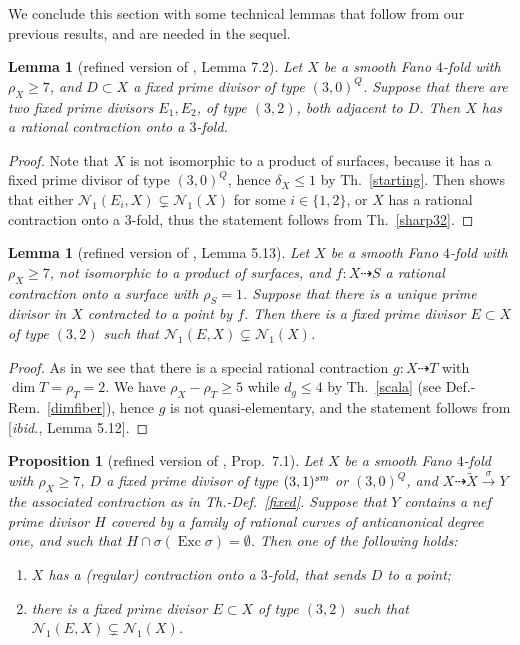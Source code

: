 \documentclass[a4paper,12pt]{amsart}
\newtheorem{lemma}[thm]{Lemma}
\newtheorem{proposition}[thm]{Proposition}
\theoremstyle{definition}
\numberwithin{figure}{section}
\numberwithin{table}{section}
\newcommand{\w}{\widetilde}
\newcommand{\N}{\mathcal{N}_1}
\newcommand{\Exc}{\operatorname{Exc}}
\newcommand{\sm}{\text{\it sm}}
\begin{document}
We conclude this section with some technical lemmas that follow from our previous results, and are needed in the sequel.
\begin{lemma}[refined version of \cite{small}, Lemma 7.2]\label{torino}
Let $X$ be a smooth Fano $4$-fold with $\rho_X\geq 7$, and $D\subset X$ a fixed prime divisor of type $(3,0)^Q$. Suppose that there are two fixed prime divisors $E_1,E_2$, of type $(3,2)$, both adjacent to $D$. 
 Then  $X$ has a rational contraction onto a $3$-fold.
  \end{lemma}
  \begin{proof}
    Note that $X$ is not isomorphic to a product of surfaces, because it has a fixed prime divisor of type $(3,0)^Q$, hence $\delta_X\leq 1$ by Th.~\ref{starting}. Then
    \cite[proof of Lemma 7.2]{small} shows that either
 $\N(E_i,X)\subsetneq\N(X)$ for some $i\in\{1,2\}$, or $X$ has
   a rational contraction onto a $3$-fold, thus the statement follows from Th.~\ref{sharp32}.
    \end{proof}
\begin{lemma}[refined version of \cite{small}, Lemma 5.13]\label{lori}
  Let $X$ be a smooth Fano $4$-fold with $\rho_X\geq 7$, not isomorphic to a product of surfaces, and $f\colon X\dasharrow S$ a rational contraction onto a surface with $\rho_S=1$. Suppose that there is a unique prime divisor in $X$ contracted to a point by $f$. Then   there is a fixed prime divisor $E\subset X$ of type $(3,2)$ such that $\N(E,X)\subsetneq\N(X)$.
\end{lemma}  
\begin{proof}
  As in \cite[proof of Lemma 5.13]{small} we see that there is a special rational contraction $g\colon X\dasharrow T$ with $\dim T=\rho_T=2$.  We have $\rho_X-\rho_T\geq 5$ while $d_g\leq 4$ by Th.~\ref{scala} (see Def.-Rem.~\ref{dimfiber}), hence   $g$ is not quasi-elementary, 
  and the statement follows from [\emph{ibid.}, Lemma 5.12].
 \end{proof}
 \begin{proposition}[refined version of \cite{small}, Prop.~7.1]\label{sabri}
    Let $X$ be a smooth Fano $4$-fold with $\rho_X\geq 7$, $D$ a fixed prime divisor of type $(3,1)^{\sm}$ or $(3,0)^Q$, and $X\dasharrow \w{X}\stackrel{\sigma}{\to} Y$ the associated contraction as in Th.-Def.~\ref{fixed}. Suppose that $Y$ contains a nef prime divisor $H$ covered by a family of rational curves of anticanonical degree one, and such that $H\cap\sigma(\Exc\sigma)=\emptyset$.
    Then   one of the following holds:
    \begin{enumerate}[$(i)$]
     \item 
       $X$ has     a (regular) contraction onto a $3$-fold, that sends $D$ to a point;
     \item there is a fixed prime divisor $E\subset X$ of type $(3,2)$ such that $\N(E,X)\subsetneq\N(X)$.
       \end{enumerate}
  \end{proposition}  
\end{document}
